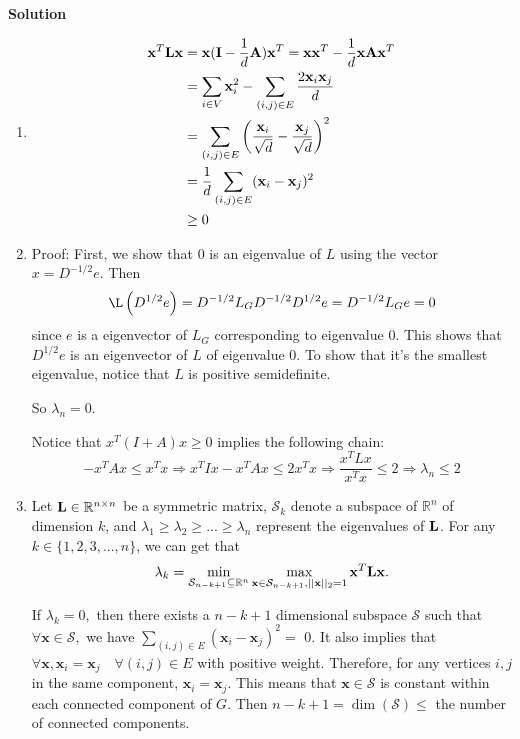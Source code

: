 \documentclass[english,onecolumn]{IEEEtran}
\newcommand{\Rbb}{\mathbb{R}}
\newcommand{\bigS}{\mathcal{S}}
\newcommand{\bA}{{\bf A}}
\newcommand{\bI}{{\bf I}}
\newcommand{\bL}{{\bf L}}
\newcommand{\bx}{{\bf x}}
\begin{document}
\noindent
\textbf{Solution}
\begin{enumerate}
	\item 	
	$$
	\begin{aligned}
		\bx^T\bL\bx
		&=\bx (\bI-\frac{1}{d}\bA)\bx^T = \bx \bx^T - \frac{1}{d} \bx \bA \bx^T \\
		&=\sum_{i \in V} \bx_i^{2}-\sum_{(i, j) \in E} \frac{2 \bx_i \bx_j}{d} \\
		&=\sum_{(i, j) \in E}\left(\frac{\bx_i}{\sqrt{d}}-\frac{\bx_j}{\sqrt{d}}\right)^{2} \\
		&=\frac{1}{d}\sum_{(i,j)\in E}(\bx_i-\bx_j)^2\\
		& \geq 0
	\end{aligned}
	$$
	\item
	Proof: First, we show that 0 is an eigenvalue of $L$ using the vector $x=D^{-1 / 2} e .$ Then
	$$
	\L\left(D^{1 / 2} e\right)=D^{-1 / 2} L_{G} D^{-1 / 2} D^{1 / 2} e=D^{-1 / 2} L_{G} e=0
	$$
	since $e$ is a eigenvector of $L_{G}$ corresponding to eigenvalue $0 .$ This shows that $D^{1 / 2} e$ is an eigenvector of $L$ of eigenvalue $0 .$ To show that it's the smallest eigenvalue, notice that $L$ is positive semidefinite.
	
	So $\lambda_n=0$.

	Notice that $x^{T}(I+A) x \geq 0$ implies the following chain:
	$$
	-x^{T} A x \leq x^{T} x \Longrightarrow x^{T} I x-x^{T} A x \leq 2 x^{T} x \Longrightarrow \frac{x^{T} L x}{x^{T} x} \leq 2 \Longrightarrow \lambda_{n} \leq 2
	$$
    \item Let $\bL\in \Rbb^{n\times n}$ be a symmetric matrix, $\bigS_k$ denote a subspace of $\Rbb^n$ of dimension $k$, and $\lambda_1\geq \lambda_2\geq...\geq \lambda_n$ represent the eigenvalues of $\bL$. 
    For any $k\in\{1,2,3,...,n\}$, we can get that \[\lambda_k=\min\limits_{\bigS_{n-k+1}\subseteq \Rbb^n}\max\limits_{\bx\in\bigS_{n-k+1},||\bx||_2=1} \bx^T\bL\bx.\]



If $\lambda_{k}=0,$ then there exists a $n-k+1$ dimensional subspace $\mathcal{S}$ such that $\forall \mathbf{x} \in \mathcal{S},$ we have $\sum_{(i, j) \in E}\left(\mathbf{x}_{i}-\mathbf{x}_{j}\right)^{2}=$
0. It also implies that $\forall \mathbf{x}, \mathbf{x}_{i}=\mathbf{x}_{j} \quad \forall(i, j) \in E$ with positive weight. Therefore, for any vertices $i, j$ in the
same component, $\mathbf{x}_{i}=\mathbf{x}_{j} .$ This means that $\mathbf{x} \in \mathcal{S}$ is constant within each connected component of $G$. Then
$n-k+1=\operatorname{dim}(\mathcal{S}) \leq$ the number of connected components.


\end{enumerate}
\end{document}
